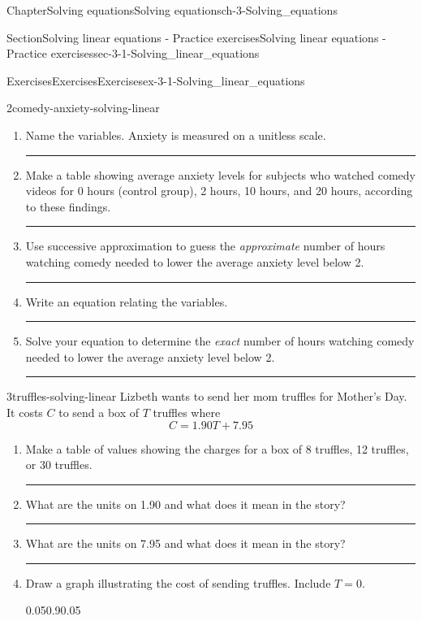\documentclass[twoside,11pt,]{book}
\newlength{\workspacestrutwidth}
\numberwithin{equation}{section}
\begin{document}
\begin{chapterptx}{Chapter}{Solving equations}{}{Solving equations}{}{}{ch-3-Solving_equations}
\begin{sectionptx}{Section}{Solving linear equations - Practice exercises}{}{Solving linear equations - Practice exercises}{}{}{sec-3-1-Solving_linear_equations}
\begin{exercises-subsection-numberless}{Exercises}{Exercises}{}{Exercises}{}{}{ex-3-1-Solving_linear_equations}
\begin{divisionexercise}{2}{}{}{comedy-anxiety-solving-linear}
\begin{enumerate}[label=(\alph*),ref=\alph*]%
\item{}Name the variables. Anxiety is measured on a unitless scale.%
\par\rule{\workspacestrutwidth}{0.8in}%
\item{}Make a table showing average anxiety levels for subjects who watched comedy videos for 0 hours (control group), 2 hours, 10 hours, and 20 hours, according to these findings.%
\par\rule{\workspacestrutwidth}{0.8in}%
\item{}Use successive approximation to guess the \emph{approximate} number of hours watching comedy needed to lower the average anxiety level below 2.%
\par\rule{\workspacestrutwidth}{0.8in}%
\item{}Write an equation relating the variables.%
\par\rule{\workspacestrutwidth}{0.8in}%
\item{}Solve your equation to determine the \emph{exact} number of hours watching comedy needed to lower the average anxiety level below 2.%
\par\rule{\workspacestrutwidth}{0.8in}%
\end{enumerate}%
\end{divisionexercise}%
\clearpage
\begin{divisionexercise}{3}{}{}{truffles-solving-linear}%
Lizbeth wants to send her mom truffles for Mother's Day. It costs \textdollar{}\(C\) to send a box of \(T\) truffles where%
\begin{equation*}
C = 1.90T+7.95
\end{equation*}
%
\begin{enumerate}[label=(\alph*),ref=\alph*]%
\item{}Make a table of values showing the charges for a box of 8 truffles, 12 truffles, or 30 truffles.%
\par\rule{\workspacestrutwidth}{0.75in}%
\item{}What are the units on 1.90 and what does it mean in the story?%
\par\rule{\workspacestrutwidth}{0.5in}%
\item{}What are the units on 7.95 and what does it mean in the story?%
\par\rule{\workspacestrutwidth}{0.5in}%
\item{}Draw a graph illustrating the cost of sending truffles. Include \(T=0\).%
\begin{image}{0.05}{0.9}{0.05}{}%

\end{image}
\end{enumerate}
\end{divisionexercise}
\end{exercises-subsection-numberless}
\end{sectionptx}
\end{chapterptx}
\end{document}
